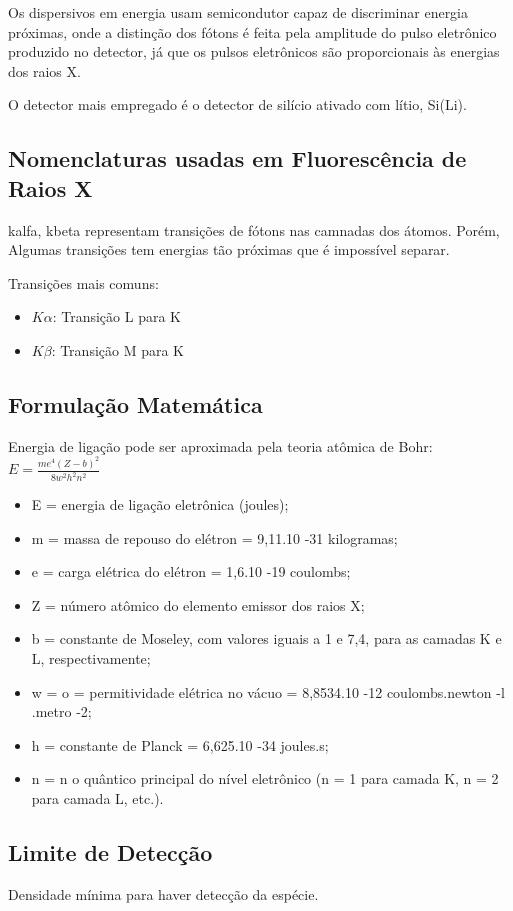 Os dispersivos em energia usam semicondutor capaz de discriminar energia 
próximas, onde a distinção dos fótons é feita pela amplitude do pulso 
eletrônico produzido no detector, já que os pulsos eletrônicos são
proporcionais às energias dos raios X. 

O detector mais empregado é o detector de silício ativado com lítio, Si(Li).

\subsection{Nomenclaturas usadas em Fluorescência de Raios X}
kalfa, kbeta representam transições de fótons nas camnadas dos átomos.
Porém, Algumas transições tem energias tão próximas que é impossível separar.

Transições mais comuns:
\begin{itemize}
  \item $K\alpha$: Transição L para K
  \item $K\beta$: Transição M para K
\end{itemize}


\subsection{Formulação Matemática}

Energia de ligação pode ser aproximada pela teoria atômica de Bohr:
\begin{math}
E = \frac{me^4(Z-b)^2}{8w^2h^2n^2}
\end{math}

\begin{itemize}
  \item E = energia de ligação eletrônica (joules);
  \item m = massa de repouso do elétron = 9,11.10 -31 kilogramas;
  \item e = carga elétrica do elétron = 1,6.10 -19 coulombs;
  \item Z = número atômico do elemento emissor dos raios X;
  \item b = constante de Moseley, com valores iguais a 1 e 7,4, 
        para as camadas K e L, respectivamente;
  \item w = o = permitividade elétrica no vácuo = 8,8534.10 -12 
        coulombs.newton -l .metro -2;
  \item h = constante de Planck = 6,625.10 -34 joules.s;
  \item n = n o quântico principal do nível eletrônico 
        (n = 1 para camada K, n = 2 para camada L, etc.).
\end{itemize}

\subsection{Limite de Detecção}

Densidade mínima para haver detecção da espécie. 


